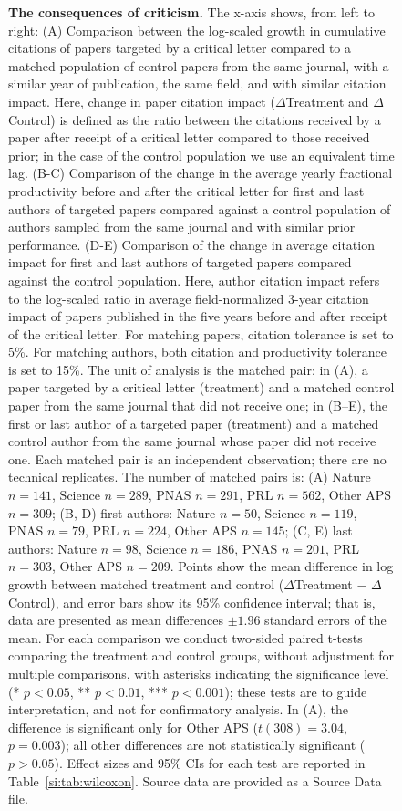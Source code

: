 \documentclass[12pt,a4paper]{article}
\numberwithin{equation}{section}
\begin{document}
\begin{figure}
    \centering
    \caption{
    \textbf{The consequences of criticism.}
    The x-axis shows, from left to right:
    (A) Comparison between the log-scaled growth in cumulative citations of papers targeted by a critical letter compared to a matched population of control papers from the same journal, with a similar year of publication, the same field, and with similar citation impact. 
    Here, change in paper citation impact ($\Delta$Treatment and $\Delta$Control) is defined as the ratio between the citations received by a paper after receipt of a critical letter compared to those received prior; in the case of the control population we use an equivalent time lag.
    (B-C) Comparison of the change in the average yearly fractional productivity before and after the critical letter for first and last authors of targeted papers compared against a control population of authors sampled from the same journal and with similar prior performance. 
    (D-E) Comparison of the change in average citation impact for first and last authors of targeted papers compared against the control population.
    Here, author citation impact refers to the log-scaled ratio in average field-normalized 3-year citation impact of papers published in the five years before and after receipt of the critical letter. 
    For matching papers, citation tolerance is set to 5\%. 
    For matching authors, both citation and productivity tolerance is set to 15\%.
    The unit of analysis is the matched pair: in (A), a paper targeted by a critical letter (treatment) and a matched control paper from the same journal that did not receive one; in (B--E), the first or last author of a targeted paper (treatment) and a matched control author from the same journal whose paper did not receive one.
    Each matched pair is an independent observation; there are no technical replicates.
    The number of matched pairs is: (A) Nature $n = 141$, Science $n = 289$, PNAS $n = 291$, PRL $n = 562$, Other APS $n = 309$; (B, D) first authors: Nature $n = 50$, Science $n = 119$, PNAS $n = 79$, PRL $n = 224$, Other APS $n = 145$; (C, E) last authors: Nature $n = 98$, Science $n = 186$, PNAS $n = 201$, PRL $n = 303$, Other APS $n = 209$.
    Points show the mean difference in log growth between matched treatment and control ($\Delta$Treatment $-$ $\Delta$Control), and error bars show its 95\% confidence interval; that is, data are presented as mean differences $\pm 1.96$ standard errors of the mean.
    For each comparison we conduct two-sided paired t-tests comparing the treatment and control groups, without adjustment for multiple comparisons, with asterisks indicating the significance level (* $p < 0.05$, ** $p < 0.01$, *** $p < 0.001$); these tests are to guide interpretation, and not for confirmatory analysis.
    In (A), the difference is significant only for Other APS ($t(308) = 3.04$, $p = 0.003$); all other differences are not statistically significant ($p > 0.05$).
    Effect sizes and 95\% CIs for each test are reported in Table~\ref*{si:tab:wilcoxon}.
    Source data are provided as a Source Data file.
    }
    \label{fig:matched-results-impact}
\end{figure}
\end{document}
